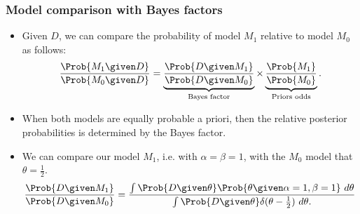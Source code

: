 \documentclass{slides}
\begin{document}
\begin{frame}
	\frametitle{Model comparison with Bayes factors}
	\begin{itemize}
		\item Given $D$, we can compare the probability of model $M_1$ relative to model $M_0$ as follows:
			\begin{align*}
				\frac{\Prob{M_1\given D}}{\Prob{M_0\given D}} = 
				\underbrace{\frac{\Prob{D\given M_1}}{\Prob{D\given M_0}}}_{\text{Bayes factor}} \times
				\underbrace{\frac{\Prob{M_1}}{\Prob{M_0}}}_{\text{Priors odds}}. 
			\end{align*}
		\item When both models are equally probable a priori, then the relative posterior probabilities is determined by the Bayes factor.
		\item We can compare our model $M_1$, i.e. with $\alpha = \beta = 1$, with the $M_0$ model that $\theta = \frac{1}{2}$.
			\begin{align*}
				\frac{\Prob{D\given M_1}}{\Prob{D\given M_0}} = \frac{
				\int\Prob{D\given\theta}\Prob{\theta\given\alpha=1,\beta=1}\ d\theta 
				}{
					\int\Prob{D\given\theta} \delta(\theta-\frac{1}{2})\ d\theta.
				}
			\end{align*}
\end{itemize}

	\end{frame} 
	
\end{document}

